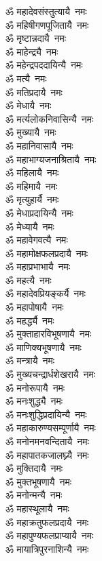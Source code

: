 \begin{flushleft}
\begin{multicols}{2}
ॐ महादेवसंस्तुत्यायै~नमः\\
ॐ महिषीगणपूजितायै~नमः\\
ॐ मृष्टान्नदायै~नमः\\
ॐ माहेन्द्र्यै~नमः\\
ॐ महेन्द्रपददायिन्यै~नमः\\
ॐ मत्यै~नमः\\
ॐ मतिप्रदायै~नमः\hfill{}\\
ॐ मेधायै~नमः\\
ॐ मर्त्यलोकनिवासिन्यै~नमः\\
ॐ मुख्यायै~नमः\\
ॐ महानिवासायै~नमः\\
ॐ महाभाग्यजनाश्रितायै~नमः\\
ॐ महिलायै~नमः\\
ॐ महिमायै~नमः\\
ॐ मृत्युहार्यै~नमः\\
ॐ मेधाप्रदायिन्यै~नमः\\
ॐ मेध्यायै~नमः\hfill{}\\
ॐ महावेगवत्यै~नमः\\
ॐ महामोक्षफलप्रदायै~नमः\\
ॐ महाप्रभाभायै~नमः\\
ॐ महत्यै~नमः\\
ॐ महादेवप्रियङ्कर्यै~नमः\\
ॐ महापोषायै~नमः\\
ॐ महर्द्ध्यै~नमः\\
ॐ मुक्ताहारविभूषणायै~नमः\\
ॐ माणिक्यभूषणायै~नमः\\
ॐ मन्त्रायै~नमः\hfill{}\\
ॐ मुख्यचन्द्रार्धशेखरायै~नमः\\
ॐ मनोरूपायै~नमः\\
ॐ मनःशुद्ध्यै~नमः\\
ॐ मनःशुद्धिप्रदायिन्यै~नमः\\
ॐ महाकारुण्यसम्पूर्णायै~नमः\\
ॐ मनोनमनवन्दितायै~नमः\\
ॐ महापातकजालघ्न्यै~नमः\\
ॐ मुक्तिदायै~नमः\\
ॐ मुक्तभूषणायै~नमः\\
ॐ मनोन्मन्यै~नमः\hfill{}\\
ॐ महास्थूलायै~नमः\\
ॐ महाक्रतुफलप्रदायै~नमः\\
ॐ महापुण्यफलप्राप्यायै~नमः\\
ॐ मायात्रिपुरनाशिन्यै~नमः\\

\end{multicols}
\end{flushleft}
